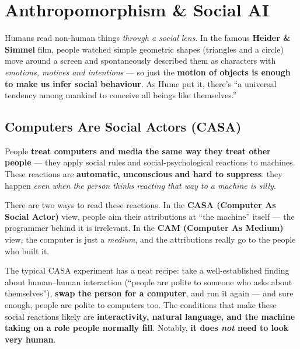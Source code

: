 \documentclass[11pt, oneside]{book}
\begin{document}
\chapter{Anthropomorphism \& Social AI}

Humans read non-human things \emph{through a social lens}. In the famous
\textbf{Heider \& Simmel} film, people watched simple geometric shapes
(triangles and a circle) move around a screen and spontaneously described them
as characters with \emph{emotions, motives and intentions} — so just the
\textbf{motion of objects is enough to make us infer social behaviour}. As Hume
put it, there's ``a universal tendency among mankind to conceive all beings
like themselves.''

\section{Computers Are Social Actors (CASA)}

\begin{defbox}[title={CASA paradigm (``The Media Equation'')}]
People \textbf{treat computers and media the same way they treat other people}
— they apply social rules and social-psychological reactions to machines.
These reactions are \textbf{automatic, unconscious and hard to suppress}: they
happen \emph{even when the person thinks reacting that way to a machine is
silly}.
\end{defbox}

There are two ways to read these reactions. In the \textbf{CASA (Computer As
Social Actor)} view, people aim their attributions at ``the machine'' itself —
the programmer behind it is irrelevant. In the \textbf{CAM (Computer As
Medium)} view, the computer is just a \emph{medium}, and the attributions
really go to the people who built it.

The typical CASA experiment has a neat recipe: take a well-established finding
about human–human interaction (``people are polite to someone who asks about
themselves''), \textbf{swap the person for a computer}, and run it again — and
sure enough, people are polite to computers too. The conditions that make these
social reactions likely are \textbf{interactivity, natural language, and the
machine taking on a role people normally fill}. Notably, \textbf{it does
\emph{not} need to look very human}.
\end{document}
